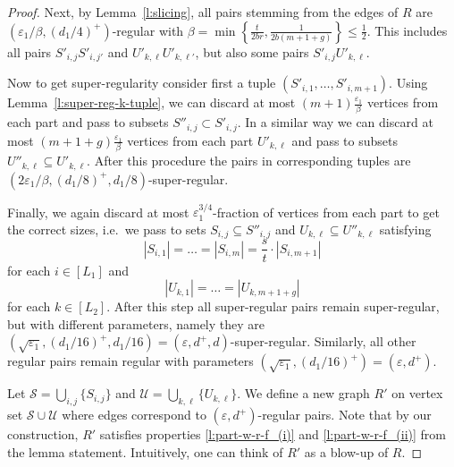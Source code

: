\documentclass[reqno, 12pt]{amsart}
\numberwithin{equation}{section}
\numberwithin{figure}{section}
\theoremstyle{plain}
\theoremstyle{definition}
\let\eps=\varepsilon
\def\cS{{\mathcal S}}
\def\cU{{\mathcal U}}
\begin{document}
\begin{proof}
        Next, by Lemma~\ref{l:slicing}, all pairs stemming from the edges of $R$ are $\left(\eps_1/\beta, \left(d_1/4\right)^+\right)$-regular with $\beta = \min\left\{\frac{t}{2br}, \frac{1}{2b(m+1+g)}\right\}\leq\frac12$. This includes all pairs $S'_{i,j}S'_{i,j'}$ and $U'_{k,\ell}U'_{k,\ell'}$, but also some pairs $S'_{i,j}U'_{k,\ell}$. 

        Now to get super-regularity consider first a tuple $(S'_{i,1},\dots,S'_{i,m+1})$. Using Lemma~\ref{l:super-reg-k-tuple}, we can discard at most $(m+1)\frac{\eps_1}{\beta}$ vertices from each part and pass to subsets $S''_{i,j}\subset S'_{i,j}$. In a similar way we can discard at most $(m+1+g)\frac{\eps_1}{\beta}$ vertices from each part $U'_{k,\ell}$ and pass to subsets $U''_{k,\ell}\subseteq U'_{k,\ell}$. After this procedure the pairs in corresponding tuples are $\left(2\eps_1/\beta, \left(d_1/8\right)^+, d_1/8\right)$-super-regular.
          
        Finally, we again discard at most $\eps_1^{3/4}$-fraction of vertices from each part to get the correct sizes, i.e.~we pass to sets $S_{i,j}\subseteq S''_{i,j}$ and $U_{k,\ell}\subseteq U''_{k,\ell}$ satisfying \[|S_{i,1}|= \ldots = |S_{i,m}| = \frac {s}{t} \cdot |S_{i,m+1}|\] 
        for each $i\in[L_1]$ and 
        \[|U_{k,1}|= \ldots = |U_{k,m+1+g}|\] 
        for each $k\in[L_2]$. After this step all super-regular pairs remain super-regular, but with different parameters, namely they are $\left(\sqrt{\eps_1}, \left(d_1/16\right)^+,d_1/16\right)=\left(\eps,d^+,d\right)$-super-regular. Similarly, all other regular pairs remain regular with parameters $\left(\sqrt{\eps_1}, \left(d_1/16\right)^+\right)=\left(\eps,d^+\right)$.
         
         Let $\cS = \bigcup_{i,j}\{S_{i,j}\}$ and $\cU = \bigcup_{k,\ell}\{U_{k,\ell}\}$. We define a new graph $R'$ on vertex set $\cS\cup\cU$ where edges correspond to $\left(\eps, d^+\right)$-regular pairs. Note that by our construction, $R'$ satisfies properties \ref{l:part-w-r-f_(i)} and \ref{l:part-w-r-f_(ii)} from the lemma statement. Intuitively, one can think of $R'$ as a blow-up of $R$.


\end{proof}
\end{document}
